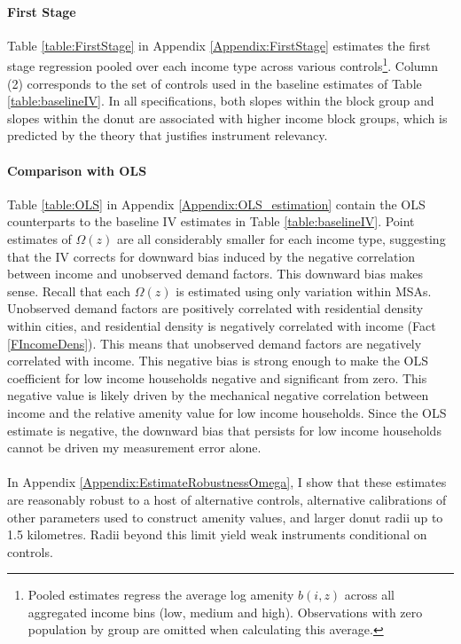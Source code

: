 \documentclass[12pt]{article}
\begin{document}
\paragraph*{First Stage} Table \ref{table:FirstStage} in Appendix \ref{Appendix:FirstStage} estimates the first stage regression pooled over each income type across various controls\footnote{Pooled estimates regress the average log amenity $b(i, z)$ across all aggregated income bins (low, medium and high). Observations with zero population by group are omitted when calculating this average.}. Column (2) corresponds to the set of controls used in the baseline estimates of Table \ref{table:baselineIV}. In all specifications, both slopes within the block group and slopes within the donut are associated with higher income block groups, which is predicted by the theory that justifies instrument relevancy. 

\paragraph*{Comparison with OLS} Table \ref{table:OLS} in Appendix \ref{Appendix:OLS_estimation} contain the OLS counterparts to the baseline IV estimates in Table \ref{table:baselineIV}. Point estimates of $\Omega(z)$ are all considerably smaller for each income type, suggesting that the IV corrects for downward bias induced by the negative correlation between income and unobserved demand factors. This downward bias makes sense. Recall that each $\Omega(z)$ is estimated using only variation within MSAs. Unobserved demand factors are positively correlated with residential density within cities, and residential density is negatively correlated with income (Fact \ref{FIncomeDens}). This means that unobserved demand factors are negatively correlated with income. This negative bias is strong enough to make the OLS coefficient for low income households negative and significant from zero. This negative value is likely driven by the mechanical negative correlation between income and the relative amenity value for low income households. Since the OLS estimate is negative, the downward bias that persists for low income households cannot be driven my measurement error alone.

\paragraph*{}
In Appendix \ref{Appendix:EstimateRobustnessOmega}, I show that these estimates are reasonably robust to a host of alternative controls, alternative calibrations of other parameters used to construct amenity values, and larger donut radii up to 1.5 kilometres. Radii beyond this limit yield weak instruments conditional on controls. 
\end{document}
